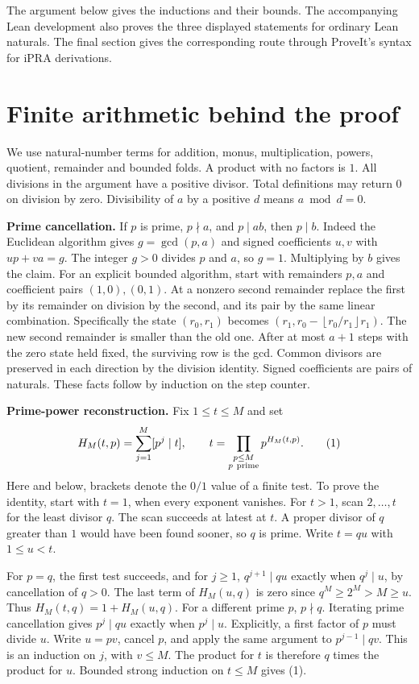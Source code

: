 \documentclass[12pt,letterpaper]{article}
\newcommand{\fl}[1]{\left\lfloor #1\right\rfloor}
\newcommand{\lead}[1]{\textsf{\bfseries\color{ink}#1}\enspace}
\newcommand{\pagepart}{\clearpage}
\begin{document}
The argument below gives the inductions and their bounds. The accompanying Lean development also proves the three displayed statements for ordinary Lean naturals. The final section gives the corresponding route through ProveIt's syntax for iPRA derivations.

\pagepart\section{Finite arithmetic behind the proof}\label{s:finite}
We use natural-number terms for addition, monus, multiplication, powers, quotient, remainder and bounded folds. A product with no factors is \(1\). All divisions in the argument have a positive divisor. Total definitions may return \(0\) on division by zero. Divisibility of \(a\) by a positive \(d\) means \(a\bmod d=0\).

\lead{Prime cancellation.} If \(p\) is prime, \(p\nmid a\), and \(p\mid ab\), then \(p\mid b\). Indeed the Euclidean algorithm gives \(g=\gcd(p,a)\) and signed coefficients \(u,v\) with \(up+va=g\). The integer \(g>0\) divides \(p\) and \(a\), so \(g=1\). Multiplying by \(b\) gives the claim. For an explicit bounded algorithm, start with remainders \(p,a\) and coefficient pairs \((1,0),(0,1)\). At a nonzero second remainder replace the first by its remainder on division by the second, and its pair by the same linear combination. Specifically the state \((r_0,r_1)\) becomes \((r_1,r_0-\fl{r_0/r_1}r_1)\). The new second remainder is smaller than the old one. After at most \(a+1\) steps with the zero state held fixed, the surviving row is the gcd. Common divisors are preserved in each direction by the division identity. Signed coefficients are pairs of naturals. These facts follow by induction on the step counter.

\lead{Prime-power reconstruction.} Fix \(1\le t\le M\) and set
\[
 H_M(t,p)=\sum_{j=1}^{M}[p^j\mid t],\qquad
 t=\prod_{\substack{p\le M\\p\ {\rm prime}}}p^{H_M(t,p)}. \tag{1}\label{eq:recon}
\]
Here and below, brackets denote the \(0/1\) value of a finite test. To prove the identity, start with \(t=1\), when every exponent vanishes. For \(t>1\), scan \(2,\ldots,t\) for the least divisor \(q\). The scan succeeds at latest at \(t\). A proper divisor of \(q\) greater than \(1\) would have been found sooner, so \(q\) is prime. Write \(t=qu\) with \(1\le u<t\).

For \(p=q\), the first test succeeds, and for \(j\ge1\), \(q^{j+1}\mid qu\) exactly when \(q^j\mid u\), by cancellation of \(q>0\). The last term of \(H_M(u,q)\) is zero since \(q^M\ge2^M>M\ge u\). Thus \(H_M(t,q)=1+H_M(u,q)\). For a different prime \(p\), \(p\nmid q\). Iterating prime cancellation gives \(p^j\mid qu\) exactly when \(p^j\mid u\). Explicitly, a first factor of \(p\) must divide \(u\). Write \(u=pv\), cancel \(p\), and apply the same argument to \(p^{j-1}\mid qv\). This is an induction on \(j\), with \(v\le M\). The product for \(t\) is therefore \(q\) times the product for \(u\). Bounded strong induction on \(t\le M\) gives (1).
\end{document}
